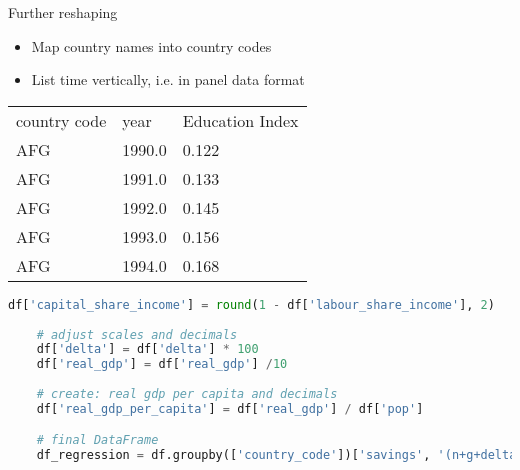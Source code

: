 \documentclass{beamer}
\begin{document}
\begin{frame}{Further reshaping}
	\begin{itemize}
		\item Map country names into country codes
		\item List time vertically, i.e. in panel data format
	\end{itemize}
	\begin{center}
	\begin{tabular}{lll}
	country code & year   & Education Index \\
	AFG          & 1990.0 & 0.122           \\
	AFG          & 1991.0 & 0.133           \\
	AFG          & 1992.0 & 0.145           \\
	AFG          & 1993.0 & 0.156           \\
	AFG          & 1994.0 & 0.168          
\end{tabular}
	\end{center}

\end{frame}

\begin{frame}[fragile]
\begin{lstlisting}[language=Python]
	df['capital_share_income'] = round(1 - df['labour_share_income'], 2)
	
	# adjust scales and decimals
	df['delta'] = df['delta'] * 100
	df['real_gdp'] = df['real_gdp'] /10
	
	# create: real gdp per capita and decimals
	df['real_gdp_per_capita'] = df['real_gdp'] / df['pop']

	# final DataFrame
	df_regression = df.groupby(['country_code'])['savings', '(n+g+delta)', 'pop', 'hc', 'Education Index'].agg('mean')
	
\end{lstlisting}

\end{frame}
\end{document}
